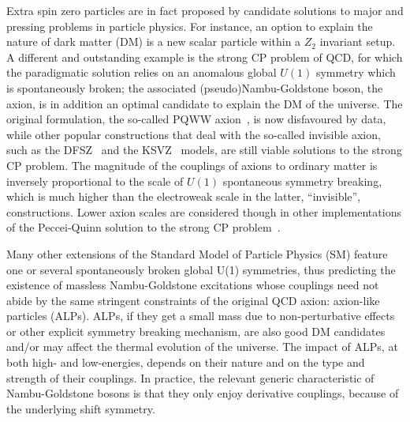 \documentclass[11pt]{article}
\renewcommand{\[}{\begin{equation}}
\renewcommand{\]}{\end{equation}}
\begin{document}
Extra spin zero particles are in fact proposed by candidate solutions to major and pressing problems in particle physics. For instance, an option to explain 
the nature of dark matter (DM) 
 is a new scalar particle within a $Z_2$ invariant setup.  A different and outstanding example is the strong CP problem of QCD, for which the paradigmatic solution 
 relies on an anomalous global  $U(1)$ symmetry which is spontaneously broken; the associated (pseudo)Nambu-Goldstone boson, the axion, is in addition an optimal 
 candidate to explain the DM of the universe. The original 
formulation, the so-called PQWW axion~\cite{Peccei:1977hh,Weinberg:1977ma,Wilczek:1977pj}, is now disfavoured by data, while other popular constructions that 
deal with the so-called invisible axion, such as the DFSZ~\cite{Zhitnitsky:1980tq,Dine:1981rt} and the KSVZ~\cite{Kim:1979if,Shifman:1979if} models, are still 
viable solutions to the strong CP problem.  The magnitude of the couplings of axions to ordinary matter is inversely proportional to the scale of $U(1)$ spontaneous 
symmetry breaking, which is much higher than the electroweak scale in the latter, ``invisible'', constructions. Lower axion scales are considered though in other 
implementations of the Peccei-Quinn solution to the strong 
CP problem~\cite{Dimopoulos:1979qi, Dimopoulos:1979pp, Tye:1981zy, Holdom:1982ex, Kim:1984pt, Kaplan:1985dv, Randall:1992ut, Rubakov:1997vp, Berezhiani:2000gh, Gianfagna:2004je, Hook:2014cda, Fukuda:2015ana, Albaid:2015axa, Chiang:2016eav, Wilczek:2016gzx}.


Many other extensions of the Standard Model of Particle Physics (SM) feature one or several spontaneously broken global U(1) symmetries, 
thus predicting the existence of massless Nambu-Goldstone excitations whose couplings need not abide by the same stringent constraints of the 
original QCD axion: axion-like particles (ALPs).  ALPs, if they get a small mass due to non-perturbative effects or other explicit symmetry breaking mechanism, are 
also good DM candidates and/or may  affect the thermal evolution of the universe.  The impact of ALPs, at both high- and low-energies, 
depends on their nature and on the type and strength of their couplings.  In practice, the relevant  generic characteristic of Nambu-Goldstone bosons is that they 
only enjoy derivative couplings, because of the underlying shift symmetry.
\end{document}
